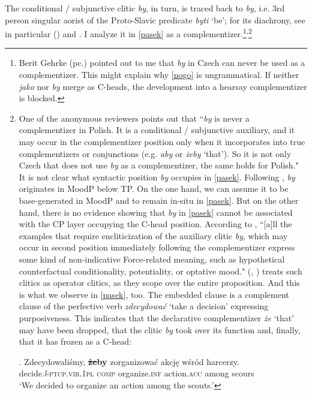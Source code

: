\documentclass[output=paper
,modfonts
,nonflat]{langsci/langscibook}
\newcommand{\glossformat}[1]{\textsc{#1}}
\newcommand{\firstperson}{\glossformat{1}\xspace}
\newcommand{\acc}{\glossformat{acc}\xspace}
\newcommand{\comp}{\glossformat{comp}\xspace}
\newcommand{\infv}{\glossformat{inf}\xspace}
\newcommand{\lptcp}{\emph{l}\glossformat{-ptcp}\xspace}
\newcommand{\pl}{\glossformat{pl}\xspace}
\newcommand{\vir}{\glossformat{vir}\xspace}
\begin{document}
The conditional / subjunctive clitic \emph{by}, in turn, is traced back to \*\emph{by}, i.e. 3rd person singular aorist of the Proto-Slavic predicate \*\emph{byti} `be'; for its diachrony, see in particular \citeauthor{Migdalski2016} (\citeyear{Migdalski2006, Migdalski2009, Migdalski2016}) and \textcite{Willis2000}. I analyze it in \ref{pasek} as a complementizer.\footnote{Berit Gehrke (pc.) pointed out to me that \emph{by} in Czech can never be used as a complementizer. This might explain why \ref{nogo} is ungrammatical. If neither \emph{jako} nor \emph{by} merge as C-heads, the development into a hearsay complementizer is blocked.
}\textsuperscript{,}\footnote{One of the anonymous reviewers points out that ``\emph{by} is never a complementizer in Polish. It is a conditional / subjunctive auxiliary, and it may occur in the complementizer position only when it incorporates into true complementizers or conjunctions (e.g. \emph{aby} or \emph{żeby} `that'). So it is not only Czech that does not use \emph{by} as a complementizer, the same holds for Polish." It is not clear what syntactic position \emph{by} occupies in \ref{pasek}. Following \textcite{Migdalski2006}, \emph{by} originates in MoodP below TP. On the one hand, we can assume it to be base-generated in MoodP and to remain in-situ in \ref{pasek}. But on the other hand, there is no evidence showing that \emph{by} in  \ref{pasek} cannot be associated with the CP layer occupying the C-head position. According to  \textcite[171]{Migdalski2016}, ``[a]ll the examples that require encliticization of the auxiliary clitic \emph{by}, which may occur in second position immediately following the complementizer express some kind of non-indicative Force-related meaning, such as hypothetical counterfactual conditionality, potentiality, or optative mood." \citeauthor{Tomic2001} (\citeyear{Tomic2000}, \citeyear{Tomic2001}) treats such clitics as operator clitics, as they scope over the entire proposition. And this is what we observe in \ref{pasek}, too. The embedded clause is a complement clause of the perfective verb \emph{zdecydować} `take a decision' expressing purposiveness. This indicates that the declarative complementizer \emph{że} `that' may have been dropped, that the clitic \emph{by} took over its function and, finally, that it has frozen as a C-head:         

\exg.		Zdecydowaliśmy, \textbf{\sout{że}by} zorganizować akcję wśród harcerzy. \\
		decide.{\lptcp}.{\vir}.{\firstperson}{\pl} {\comp} organize.{\infv} action.{\acc} among scours \\
		 `We decided to organize an action among the scouts.' 

}
\end{document}
